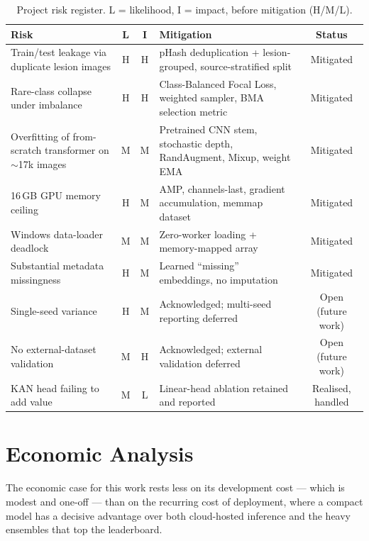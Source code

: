 \begin{table}[h]
\centering
\caption{Project risk register. L = likelihood, I = impact, before mitigation
(H/M/L).}
\label{tab:risk-register}
\begin{tabular}{p{}ccp{}c}
\toprule
Risk & L & I & Mitigation & Status \\
\midrule
Train/test leakage via duplicate lesion images & H & H & pHash deduplication + lesion-grouped, source-stratified split & Mitigated \\
Rare-class collapse under imbalance & H & H & Class-Balanced Focal Loss, weighted sampler, BMA selection metric & Mitigated \\
Overfitting of from-scratch transformer on $\sim$17k images & M & M & Pretrained CNN stem, stochastic depth, RandAugment, Mixup, weight EMA & Mitigated \\
16\,GB GPU memory ceiling & H & M & AMP, channels-last, gradient accumulation, memmap dataset & Mitigated \\
Windows data-loader deadlock & M & M & Zero-worker loading + memory-mapped array & Mitigated \\
Substantial metadata missingness & H & M & Learned ``missing'' embeddings, no imputation & Mitigated \\
Single-seed variance & H & M & Acknowledged; multi-seed reporting deferred & Open (future work) \\
No external-dataset validation & M & H & Acknowledged; external validation deferred & Open (future work) \\
KAN head failing to add value & M & L & Linear-head ablation retained and reported & Realised, handled \\
\bottomrule
\end{tabular}
\end{table}


\section{Economic Analysis}
\label{sec:economic-analysis}

The economic case for this work rests less on its development cost --- which is
modest and one-off --- than on the recurring cost of deployment, where a
compact model has a decisive advantage over both cloud-hosted inference and
the heavy ensembles that top the leaderboard.

